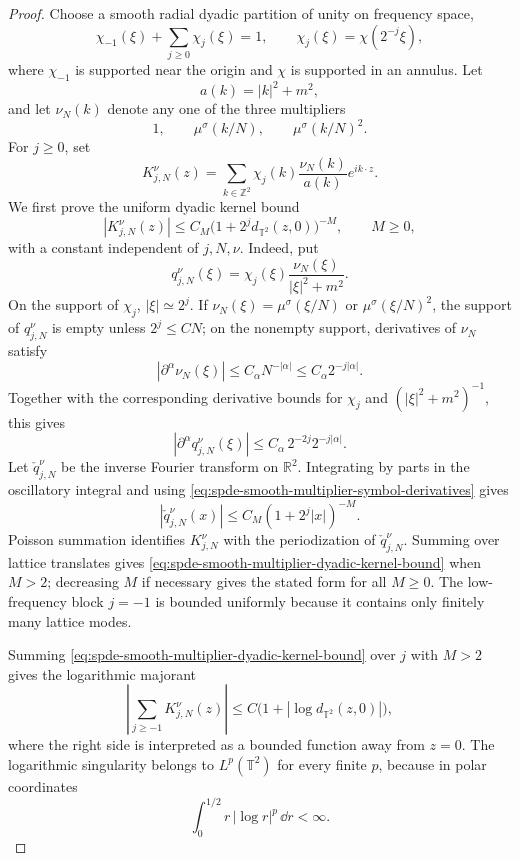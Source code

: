 \begin{proof}
Choose a smooth radial dyadic partition of unity on frequency space,
\[
  \chi_{-1}(\xi)+\sum_{j\geq0}\chi_j(\xi)=1,
  \qquad
  \chi_j(\xi)=\chi(2^{-j}\xi),
\]
where \(\chi_{-1}\) is supported near the origin and \(\chi\) is supported
in an annulus.  Let
\[
  a(k)=|k|^2+m^2,
\]
and let \(\nu_N(k)\) denote any one of the three multipliers
\[
  1,\qquad \mu^\sigma(k/N),\qquad \mu^\sigma(k/N)^2 .
\]
For \(j\geq0\), set
\[
  K_{j,N}^{\nu}(z)
  =
  \sum_{k\in\mathbb Z^2}
  \chi_j(k)\frac{\nu_N(k)}{a(k)}e^{ik\cdot z}.
\]
We first prove the uniform dyadic kernel bound
\begin{equation}
  |K_{j,N}^{\nu}(z)|
  \leq
  C_M\bigl(1+2^j d_{\mathbb T^2}(z,0)\bigr)^{-M},
  \qquad M\geq0,
  \label{eq:spde-smooth-multiplier-dyadic-kernel-bound}
\end{equation}
with a constant independent of \(j,N,\nu\).  Indeed, put
\[
  q_{j,N}^{\nu}(\xi)
  =
  \chi_j(\xi)\frac{\nu_N(\xi)}{|\xi|^2+m^2}.
\]
On the support of \(\chi_j\), \(|\xi|\simeq2^j\).  If
\(\nu_N(\xi)=\mu^\sigma(\xi/N)\) or \(\mu^\sigma(\xi/N)^2\), the support
of \(q_{j,N}^{\nu}\) is empty unless \(2^j\leq C N\); on the nonempty
support, derivatives of \(\nu_N\) satisfy
\[
  |\partial^\alpha\nu_N(\xi)|\leq C_\alpha N^{-|\alpha|}
  \leq C_\alpha 2^{-j|\alpha|}.
\]
Together with the corresponding derivative bounds for
\(\chi_j\) and \((|\xi|^2+m^2)^{-1}\), this gives
\begin{equation}
  |\partial^\alpha q_{j,N}^{\nu}(\xi)|
  \leq
  C_\alpha\,2^{-2j}2^{-j|\alpha|}.
  \label{eq:spde-smooth-multiplier-symbol-derivatives}
\end{equation}
Let \(\check q_{j,N}^{\nu}\) be the inverse Fourier transform on
\(\mathbb R^2\).  Integrating by parts in the oscillatory integral and
using \eqref{eq:spde-smooth-multiplier-symbol-derivatives} gives
\[
  |\check q_{j,N}^{\nu}(x)|
  \leq
  C_M(1+2^j|x|)^{-M}.
\]
Poisson summation identifies \(K_{j,N}^{\nu}\) with the periodization of
\(\check q_{j,N}^{\nu}\).  Summing over lattice translates gives
\eqref{eq:spde-smooth-multiplier-dyadic-kernel-bound} when \(M>2\);
decreasing \(M\) if necessary gives the stated form for all \(M\geq0\).
The low-frequency block \(j=-1\) is bounded uniformly because it contains
only finitely many lattice modes.

Summing \eqref{eq:spde-smooth-multiplier-dyadic-kernel-bound} over \(j\)
with \(M>2\) gives the logarithmic majorant
\begin{equation}
  \left|
    \sum_{j\geq-1}K_{j,N}^{\nu}(z)
  \right|
  \leq
  C\bigl(1+|\log d_{\mathbb T^2}(z,0)|\bigr),
  \label{eq:spde-smooth-multiplier-log-majorant}
\end{equation}
where the right side is interpreted as a bounded function away from
\(z=0\).  The logarithmic singularity belongs to
\(L^p(\mathbb T^2)\) for every finite \(p\), because in polar coordinates
\[
  \int_0^{1/2} r\,|\log r|^p\,\dd r<\infty .
\]


\end{proof}
